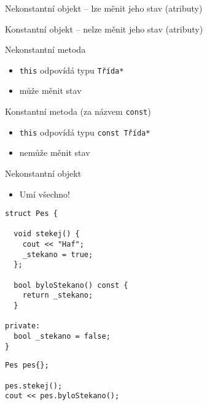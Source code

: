 
\begin{frame}[fragile]
\begin{bitemize}
\item Nekonstantní objekt -- lze měnit jeho stav (atributy)
\item Konstantní objekt -- nelze měnit jeho stav (atributy)
\end{bitemize}


\begin{bitemize}
\item Nekonstantní metoda
\begin{itemize}
\item \lstinline|this| odpovídá typu \lstinline|Třída*|
\item může měnit stav
\end{itemize}

\item Konstantní metoda (za názvem \lstinline|const|)
\begin{itemize}
\item \lstinline|this| odpovídá typu \lstinline|const Třída*|
\item nemůže měnit stav
\end{itemize}
\end{bitemize}
\end{frame}




\begin{frame}[fragile]
\begin{bitemize}
\item Nekonstantní objekt
\begin{itemize}
\item Umí všechno!
\end{itemize}
\end{bitemize}

\begin{twocols}
\begin{yesblock}
\begin{lstlisting}[basicstyle=\small]
struct Pes {

  void stekej() { 
    cout << "Haf"; 
    _stekano = true; 
  };

  bool byloStekano() const { 
    return _stekano; 
  }

private:
  bool _stekano = false;
}
\end{lstlisting}
\end{yesblock}

\twocolssep

\begin{yesblock}
\begin{lstlisting}[basicstyle=\small]
Pes pes{};

pes.stekej();
cout << pes.byloStekano();
\end{lstlisting}
\end{yesblock}

\end{twocols}
\end{frame}





